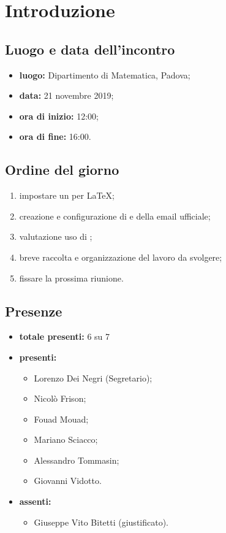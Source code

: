\section*{Introduzione}

\subsection*{Luogo e data dell'incontro}
	\begin{itemize}
		\item \textbf{luogo:} Dipartimento di Matematica, Padova;
		\item \textbf{data:} 21 novembre 2019;
		\item \textbf{ora di inizio:} 12:00;
		\item \textbf{ora di fine:} 16:00.
	\end{itemize}

\subsection*{Ordine del giorno}
	\begin{enumerate}

		\item impostare un  per \LaTeX{};
		\item creazione e configurazione di  e della email ufficiale;
		\item valutazione uso di ;
		\item breve raccolta e organizzazione del lavoro da svolgere;
		\item fissare la prossima riunione.

	\end{enumerate}

\subsection*{Presenze}
	\begin{itemize}
		\item \textbf{totale presenti:} 6 su 7
		\item \textbf{presenti: }

			\begin{itemize}			
				\item Lorenzo Dei Negri (Segretario);
				\item Nicolò Frison;
				\item Fouad Mouad;
				\item Mariano Sciacco;
				\item Alessandro Tommasin;
				\item Giovanni Vidotto.
			\end{itemize}

		\item \textbf{assenti: } 
			\begin{itemize}	
				\item Giuseppe Vito Bitetti (giustificato).
			\end{itemize}
	\end{itemize}


